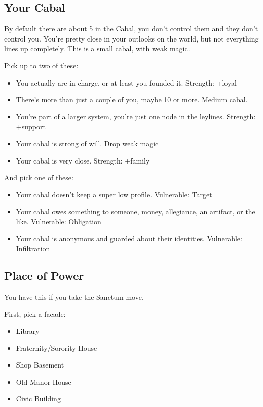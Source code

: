 \documentclass[
  oneside,
  statementpaper,
  9pt]{memoir}
\begin{document}
\hypertarget{your-cabal}{%
\subsection{Your Cabal}\label{your-cabal}}

By default there are about 5 in the Cabal, you don't control them and
they don't control you. You're pretty close in your outlooks on the
world, but not everything lines up completely. This is a small cabal,
with weak magic.

Pick up to two of these:

\begin{itemize}
\tightlist
\item
  You actually are in charge, or at least you founded it. Strength:
  +loyal
\item
  There's more than just a couple of you, maybe 10 or more. Medium
  cabal.
\item
  You're part of a larger system, you're just one node in the leylines.
  Strength: +support
\item
  Your cabal is strong of will. Drop weak magic
\item
  Your cabal is very close. Strength: +family
\end{itemize}

And pick one of these:

\begin{itemize}
\tightlist
\item
  Your cabal doesn't keep a super low profile. Vulnerable: Target
\item
  Your cabal owes something to someone, money, allegiance, an artifact,
  or the like. Vulnerable: Obligation
\item
  Your cabal is anonymous and guarded about their identities.
  Vulnerable: Infiltration
\end{itemize}

\hypertarget{place-of-power-2}{%
\subsection{Place of Power}\label{place-of-power-2}}

You have this if you take the Sanctum move.

First, pick a facade:

\begin{itemize}
\tightlist
\item
  Library
\item
  Fraternity/Sorority House
\item
  Shop Basement
\item
  Old Manor House
\item
  Civic Building
\end{itemize}
\end{document}
